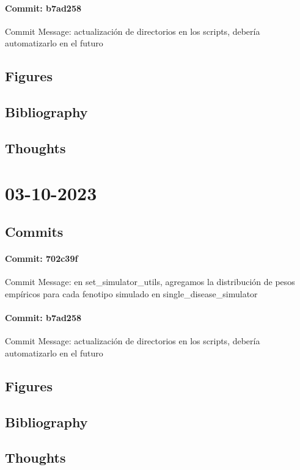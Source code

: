 \documentclass{article}
\begin{document}
\paragraph{Commit: b7ad258}
Commit Message: actualización de directorios en los scripts, debería automatizarlo en el futuro

\subsection{Figures}
\subsection{Bibliography}
\subsection{Thoughts}

\section{03-10-2023}
\subsection{Commits}
\paragraph{Commit: 702c39f}
Commit Message: en set_simulator_utils, agregamos la distribución de pesos empíricos para cada fenotipo simulado en single_disease_simulator

\paragraph{Commit: b7ad258}
Commit Message: actualización de directorios en los scripts, debería automatizarlo en el futuro

\subsection{Figures}
\subsection{Bibliography}
\subsection{Thoughts}
\end{document}
